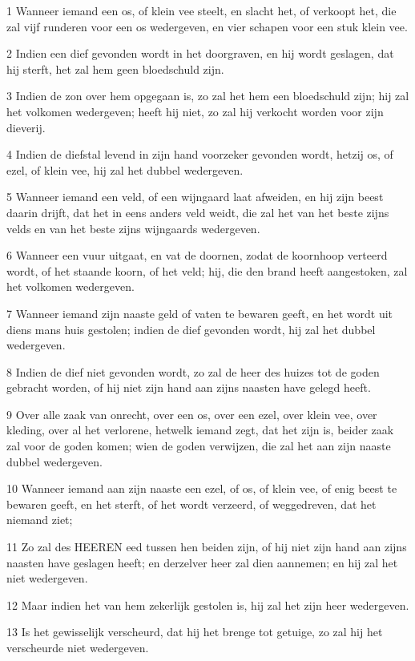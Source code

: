 \par 1 Wanneer iemand een os, of klein vee steelt, en slacht het, of verkoopt het, die zal vijf runderen voor een os wedergeven, en vier schapen voor een stuk klein vee.
\par 2 Indien een dief gevonden wordt in het doorgraven, en hij wordt geslagen, dat hij sterft, het zal hem geen bloedschuld zijn.
\par 3 Indien de zon over hem opgegaan is, zo zal het hem een bloedschuld zijn; hij zal het volkomen wedergeven; heeft hij niet, zo zal hij verkocht worden voor zijn dieverij.
\par 4 Indien de diefstal levend in zijn hand voorzeker gevonden wordt, hetzij os, of ezel, of klein vee, hij zal het dubbel wedergeven.
\par 5 Wanneer iemand een veld, of een wijngaard laat afweiden, en hij zijn beest daarin drijft, dat het in eens anders veld weidt, die zal het van het beste zijns velds en van het beste zijns wijngaards wedergeven.
\par 6 Wanneer een vuur uitgaat, en vat de doornen, zodat de koornhoop verteerd wordt, of het staande koorn, of het veld; hij, die den brand heeft aangestoken, zal het volkomen wedergeven.
\par 7 Wanneer iemand zijn naaste geld of vaten te bewaren geeft, en het wordt uit diens mans huis gestolen; indien de dief gevonden wordt, hij zal het dubbel wedergeven.
\par 8 Indien de dief niet gevonden wordt, zo zal de heer des huizes tot de goden gebracht worden, of hij niet zijn hand aan zijns naasten have gelegd heeft.
\par 9 Over alle zaak van onrecht, over een os, over een ezel, over klein vee, over kleding, over al het verlorene, hetwelk iemand zegt, dat het zijn is, beider zaak zal voor de goden komen; wien de goden verwijzen, die zal het aan zijn naaste dubbel wedergeven.
\par 10 Wanneer iemand aan zijn naaste een ezel, of os, of klein vee, of enig beest te bewaren geeft, en het sterft, of het wordt verzeerd, of weggedreven, dat het niemand ziet;
\par 11 Zo zal des HEEREN eed tussen hen beiden zijn, of hij niet zijn hand aan zijns naasten have geslagen heeft; en derzelver heer zal dien aannemen; en hij zal het niet wedergeven.
\par 12 Maar indien het van hem zekerlijk gestolen is, hij zal het zijn heer wedergeven.
\par 13 Is het gewisselijk verscheurd, dat hij het brenge tot getuige, zo zal hij het verscheurde niet wedergeven.
